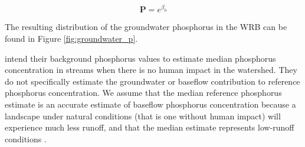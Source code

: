 	\begin{equation}
	\bm{P} = e^{\beta_0}
	\end{equation}
	
	The resulting distribution of the groundwater phosphorus in the WRB can be found in Figure \ref{fig:groundwater_p}.
	
	\citet{robertson_wadeable_2006} intend their background phosphorus values to estimate median phosphorus concentration in streams when there is no human impact in the watershed. They do not specifically estimate the groundwater or baseflow contribution to reference phosphorus concentration. We assume that the median reference phosphorus estimate is an accurate estimate of baseflow phosphorus concentration because a landscape under natural conditions (that is one without human impact) will experience much less runoff, and that the median estimate represents low-runoff conditions .
	
	
	
	